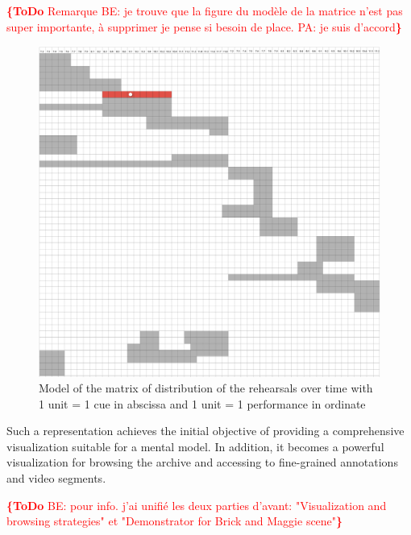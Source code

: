\documentclass[conference]{IEEEtran}
\newcommand{\todo}[1]{\noindent\textcolor{red}{{\bf \{ToDo} #1{\bf \}}}}
\begin{document}
\todo{Remarque BE: je trouve que la figure du modèle de la matrice n'est pas super importante, à supprimer je pense si besoin de place. PA: je suis d'accord}
\begin{figure}[htb!]
  \centering
  \includegraphics[width=0.75\columnwidth]{fullmatrix}
  \caption{Model of the matrix of distribution of the rehearsals over time with 1 unit = 1 cue in abscissa and 1 unit = 1 performance in ordinate}
  \label{fig:fullmatrix}
\end{figure}

Such a representation achieves the initial objective of providing a comprehensive visualization suitable for a mental model. In addition, it becomes a powerful visualization for browsing the archive and accessing to fine-grained annotations and video segments.

\todo{BE: pour info. j'ai unifié les deux parties d'avant: "Visualization and browsing strategies" et "Demonstrator for Brick and Maggie scene"}
\end{document}
